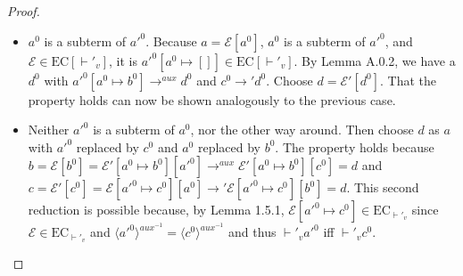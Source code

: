 \begin{proof}
\begin{enumerate}
\begin{itemize}
\item $a^0$ is a subterm of $a'^0$. Because $a = \mathcal{E}[a^0]$, $a^0$ is a subterm of $a'^0$, and $\mathcal{E} \in \textrm{EC}[\vdash'_v]$, it is $a'^0[a^0 \mapsto []] \in \textrm{EC}[\vdash'_v]$. By Lemma A.0.2, we have a $d^0$ with $a'^0[a^0 \mapsto b^0] \longrightarrow^{aux} d^0$ and $c^0 \longrightarrow' d^0$. Choose $d = \mathcal{E}'[d^0]$. That the property holds can now be shown analogously to the previous case.

\item Neither $a'^0$ is a subterm of $a^0$, nor the other way around. Then choose $d$ as $a$ with $a'^0$ replaced by $c^0$ and $a^0$ replaced by $b^0$. The property holds because $b = \mathcal{E}[b^0] = \mathcal{E}'[a^0 \mapsto b^0][a'^0] \longrightarrow^{aux} \mathcal{E}'[a^0 \mapsto b^0][c^0] = d$ and $c = \mathcal{E}'[c^0] = \mathcal{E}[a'^0 \mapsto c^0][a^0] \longrightarrow' \mathcal{E}[a'^0 \mapsto c^0][b^0] = d$. This second reduction is possible because, by Lemma 1.5.1, $\mathcal{E}[a'^0 \mapsto c^0] \in \textrm{EC}_{\vdash'_v}$ since $\mathcal{E} \in \textrm{EC}_{\vdash'_v}$ and $\langle a'^0 \rangle^{aux^{-1}} = \langle c^0 \rangle^{aux^{-1}}$ and thus $\vdash'_v a'^0$ iff $\vdash'_v c^0$.
\end{itemize}

\end{enumerate}

\end{proof}

